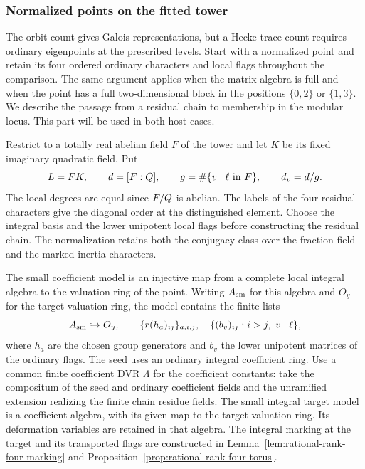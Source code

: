 \subsubsection{Normalized points on the fitted tower}
\label{par:rank-four-promodular}
\hypertarget{source-ordinary-promodularity}{}
The orbit count gives Galois representations, but a Hecke trace count requires ordinary eigenpoints at the prescribed levels. Start with a normalized point and retain its four ordered ordinary characters and local flags throughout the comparison.
The same argument applies when the matrix algebra is full and
when the point has a full two-dimensional block in the positions
\(\{0,2\}\) or \(\{1,3\}\). We describe the passage from a
residual chain to membership in the modular locus. This part
will be used in both host cases.

\begin{paramdefinition}\label{hyp:fitted-ordinary-tower}
Restrict to a totally real abelian field \(F\) of the tower and
let \(K\) be its fixed imaginary quadratic field. Put
\[
  L=FK,\qquad d=[F:Q],\qquad
  g=\#\{v\mid\ell\text{ in }F\},\qquad d_v=d/g .
\]
The local degrees are equal since \(F/Q\) is abelian. The labels of the
four residual characters give the diagonal order at the
distinguished element. Choose the integral basis and the
lower unipotent local flags before constructing the residual
chain. The normalization retains both the conjugacy class
over the fraction field and the marked inertia characters.

The small coefficient model is an injective map from a
complete local integral algebra to the valuation ring of the
point. Writing \(A_{\rm sm}\) for this algebra and \(O_y\) for the target valuation ring, the model contains the finite lists
\[
  A_{\rm sm}\hookrightarrow O_y,\qquad
  \{r(h_a)_{ij}\}_{a,i,j},\quad\{(b_v)_{ij}:i>j,\ v\mid\ell\},
\]
where \(h_a\) are the chosen group generators and \(b_v\) the lower
unipotent matrices of the ordinary flags. The seed uses an ordinary
integral coefficient ring. Use a common finite coefficient DVR \(\Lambda\) for the
coefficient constants: take the compositum of the seed and ordinary
coefficient fields and the unramified extension realizing the
finite chain residue fields. The small integral target model is
a coefficient algebra, with its given map to the target valuation
ring. Its deformation variables are retained in that algebra.
The integral marking at the target and its transported flags are
constructed in Lemma~\ref{lem:rational-rank-four-marking} and
Proposition~\ref{prop:rational-rank-four-torus}.
\end{paramdefinition}


